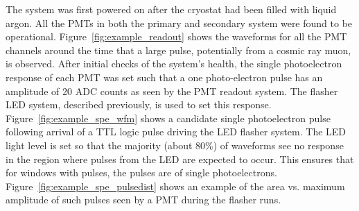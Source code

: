 The system was first powered on after the cryostat had been filled with liquid argon.  All the PMTs in both the primary and secondary system were found to be operational.  Figure~\ref{fig:example_readout} shows the waveforms for all the PMT channels around the time that a large pulse, potentially from a cosmic ray muon, is observed.  After initial checks of the system's health, the single photoelectron response of each PMT was set such that a one photo-electron pulse has an amplitude of 20 ADC counts as seen by the PMT readout system.  The flasher LED system, described previously, is used to set this response. Figure~\ref{fig:example_spe_wfm} shows a candidate single photoelectron pulse following arrival of a TTL logic pulse driving the LED flasher system.  The LED light level is set so that the majority (about 80\%) of waveforms see no response in the region where pulses from the LED are expected to occur.  This ensures that for windows with pulses, the pulses are of single photoelectrons.  Figure~\ref{fig:example_spe_pulsedist} shows an example of the area vs. maximum amplitude of such pulses seen by a PMT during the flasher runs.


